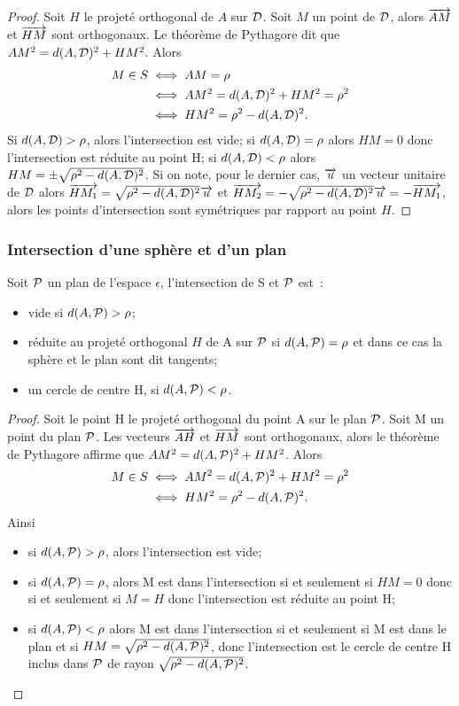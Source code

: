 \begin{proof}
  Soit \(H\) le projeté orthogonal de \(A\) sur \(\Dr\). Soit \(M\) un point de \(\Dr\), alors \(\vect{AM}\) et \(\vect{HM}\) sont orthogonaux. Le théorème de Pythagore dit que \(AM^2=d(A,\Dr)^2+HM^2\). Alors
  \begin{align}
    M \in S &\iff AM=\rho\\
    &\iff AM^2=d(A,\Dr)^2+HM^2=\rho^2\\
    &\iff HM^2=\rho^2-d(A,\Dr)^2.
  \end{align}
Si \(d(A,\Dr)>\rho\), alors l'intersection est vide; si \(d(A,\Dr)=\rho\) alors \(HM=0\) donc l'intersection est réduite au point H; si \(d(A,\Dr)<\rho\) alors \(HM=\pm\sqrt{\rho^2-d(A,\Dr)^2}\). Si on note, pour le dernier cas, \(\vu\) un vecteur unitaire de \(\Dr\) alors \(\vect{HM_1}=\sqrt{\rho^2-d(A,\Dr)^2}\vu\) et \(\vect{HM_2}=-\sqrt{\rho^2-d(A,\Dr)^2}\vu=-\vect{HM_1}\), alors les points d'intersection sont symétriques par rapport au point \(H\).
\end{proof}

\subsubsection{Intersection d'une sphère et d'un plan}

\begin{prop}
  Soit \(\P\) un plan de l'espace \(\epsilon\), l'intersection de S et \(\P\) est~:
  \begin{itemize}
  \item vide si \(d(A,\P)>\rho\);
  \item réduite au projeté orthogonal \(H\) de A sur \(\P\) si \(d(A,\P)=\rho\) et dans ce cas la sphère et le plan sont dit tangents;
  \item un cercle de centre H, si \(d(A,\P)<\rho\).
  \end{itemize}
\end{prop}
\begin{proof}
  Soit le point H le projeté orthogonal du point A sur le plan \(\P\). Soit M un point du plan \(\P\). Les vecteurs \(\vect{AH}\) et \(\vect{HM}\) sont orthogonaux, alors le théorème de Pythagore affirme que \(AM^2=d(A,\P)^2+HM^2\). Alors
  \begin{align}
    M \in S &\iff AM^2=d(A,\P)^2+HM^2=\rho^2\\
    &\iff HM^2=\rho^2-d(A,\P)^2.
  \end{align}
Ainsi
\begin{itemize}
\item si \(d(A,\P)>\rho\), alors l'intersection est vide;
\item si \(d(A,\P)=\rho\), alors M est dans l'intersection si et seulement si \(HM=0\) donc si et seulement si \(M=H\) donc l'intersection est réduite au point H;
\item si \(d(A,\P)<\rho\) alors M est dans l'intersection si et seulement si M est dans le plan et si \(HM=\sqrt{\rho^2-d(A,\P)^2}\), donc l'intersection est le cercle de centre H inclus dans \(\P\) de rayon \(\sqrt{\rho^2-d(A,\P)^2}\).
\end{itemize}
\end{proof}

